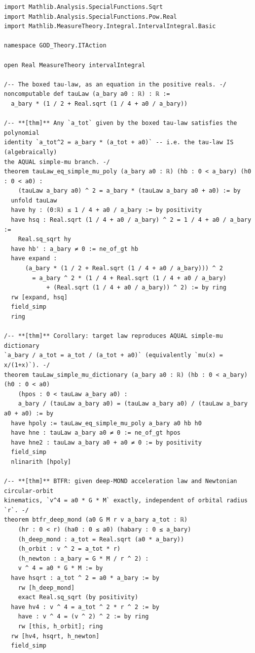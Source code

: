 \documentclass[11pt,a4paper]{article}
\theoremstyle{definition}
\begin{document}
\begin{lstlisting}[language=Lean4, caption={Machine-checked proofs in Lean 4 (\texttt{ITActionClosure.lean})}]
import Mathlib.Analysis.SpecialFunctions.Sqrt
import Mathlib.Analysis.SpecialFunctions.Pow.Real
import Mathlib.MeasureTheory.Integral.IntervalIntegral.Basic

namespace GOD_Theory.ITAction

open Real MeasureTheory intervalIntegral

/-- The boxed tau-law, as an equation in the positive reals. -/
noncomputable def tauLaw (a_bary a0 : ℝ) : ℝ :=
  a_bary * (1 / 2 + Real.sqrt (1 / 4 + a0 / a_bary))

/-- **[thm]** Any `a_tot` given by the boxed tau-law satisfies the polynomial
identity `a_tot^2 = a_bary * (a_tot + a0)` -- i.e. the tau-law IS (algebraically)
the AQUAL simple-mu branch. -/
theorem tauLaw_eq_simple_mu_poly (a_bary a0 : ℝ) (hb : 0 < a_bary) (h0 : 0 < a0) :
    (tauLaw a_bary a0) ^ 2 = a_bary * (tauLaw a_bary a0 + a0) := by
  unfold tauLaw
  have hy : (0:ℝ) ≤ 1 / 4 + a0 / a_bary := by positivity
  have hsq : Real.sqrt (1 / 4 + a0 / a_bary) ^ 2 = 1 / 4 + a0 / a_bary :=
    Real.sq_sqrt hy
  have hb' : a_bary ≠ 0 := ne_of_gt hb
  have expand :
      (a_bary * (1 / 2 + Real.sqrt (1 / 4 + a0 / a_bary))) ^ 2
        = a_bary ^ 2 * (1 / 4 + Real.sqrt (1 / 4 + a0 / a_bary)
            + (Real.sqrt (1 / 4 + a0 / a_bary)) ^ 2) := by ring
  rw [expand, hsq]
  field_simp
  ring

/-- **[thm]** Corollary: target law reproduces AQUAL simple-mu dictionary
`a_bary / a_tot = a_tot / (a_tot + a0)` (equivalently `mu(x) = x/(1+x)`). -/
theorem tauLaw_simple_mu_dictionary (a_bary a0 : ℝ) (hb : 0 < a_bary) (h0 : 0 < a0)
    (hpos : 0 < tauLaw a_bary a0) :
    a_bary / (tauLaw a_bary a0) = (tauLaw a_bary a0) / (tauLaw a_bary a0 + a0) := by
  have hpoly := tauLaw_eq_simple_mu_poly a_bary a0 hb h0
  have hne : tauLaw a_bary a0 ≠ 0 := ne_of_gt hpos
  have hne2 : tauLaw a_bary a0 + a0 ≠ 0 := by positivity
  field_simp
  nlinarith [hpoly]

/-- **[thm]** BTFR: given deep-MOND acceleration law and Newtonian circular-orbit
kinematics, `v^4 = a0 * G * M` exactly, independent of orbital radius `r`. -/
theorem btfr_deep_mond (a0 G M r v a_bary a_tot : ℝ)
    (hr : 0 < r) (ha0 : 0 ≤ a0) (habary : 0 ≤ a_bary)
    (h_deep_mond : a_tot = Real.sqrt (a0 * a_bary))
    (h_orbit : v ^ 2 = a_tot * r)
    (h_newton : a_bary = G * M / r ^ 2) :
    v ^ 4 = a0 * G * M := by
  have hsqrt : a_tot ^ 2 = a0 * a_bary := by
    rw [h_deep_mond]
    exact Real.sq_sqrt (by positivity)
  have hv4 : v ^ 4 = a_tot ^ 2 * r ^ 2 := by
    have : v ^ 4 = (v ^ 2) ^ 2 := by ring
    rw [this, h_orbit]; ring
  rw [hv4, hsqrt, h_newton]
  field_simp


\end{lstlisting}
\end{document}
